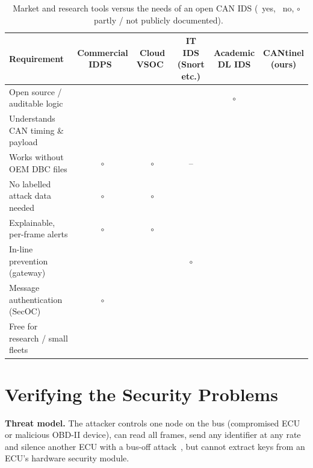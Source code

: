 \documentclass[runningheads]{llncs}
\newcommand{\cmark}{\ding{51}}
\newcommand{\xmark}{\ding{55}}
\newcommand{\pmark}{$\circ$}
\begin{document}
\begin{table}[t]
\centering
\caption{Market and research tools versus the needs of an open CAN IDS
(\cmark\ yes, \xmark\ no, \pmark\ partly / not publicly documented).}\label{tab:market}
\scriptsize
\setlength{\tabcolsep}{3pt}
\begin{tabular}{@{}lccccc@{}}
\toprule
Requirement & \shortstack{Commercial\\IDPS~\cite{plaxidityx,etas}} & \shortstack{Cloud\\VSOC~\cite{upstream2026}} & \shortstack{IT IDS\\(Snort etc.)} & \shortstack{Academic\\DL IDS} & \shortstack{CANtinel\\(ours)}\\
\midrule
Open source / auditable logic       & \xmark & \xmark & \cmark & \pmark & \cmark\\
Understands CAN timing \& payload   & \cmark & \cmark & \xmark & \cmark & \cmark\\
Works without OEM DBC files         & \pmark & \pmark & --     & \cmark & \cmark\\
No labelled attack data needed      & \pmark & \pmark & \xmark & \xmark & \cmark\\
Explainable, per-frame alerts       & \pmark & \pmark & \cmark & \xmark & \cmark\\
In-line prevention (gateway)        & \cmark & \xmark & \pmark & \xmark & \cmark\\
Message authentication (SecOC)      & \pmark & \xmark & \xmark & \xmark & \cmark\\
Free for research / small fleets    & \xmark & \xmark & \cmark & \cmark & \cmark\\
\bottomrule
\end{tabular}
\end{table}

\section{Verifying the Security Problems}\label{sec:verify}
\textbf{Threat model.} The attacker controls one node on the bus (compromised ECU or malicious OBD-II device), can read
all frames, send any identifier at any rate and silence another ECU with a bus-off attack~\cite{cho2016busoff}, but
cannot extract keys from an ECU's hardware security module.
\end{document}
